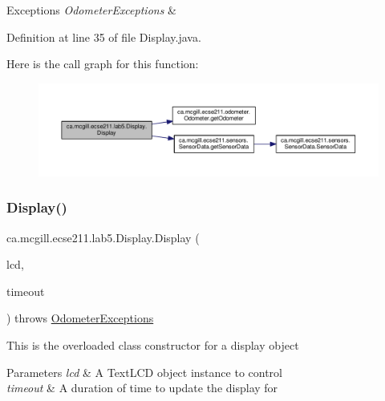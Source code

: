 \begin{DoxyExceptions}{Exceptions}
{\em Odometer\+Exceptions} & \\
\hline
\end{DoxyExceptions}


Definition at line 35 of file Display.\+java.

Here is the call graph for this function\+:\nopagebreak
\begin{figure}[H]
\begin{center}
\leavevmode
\includegraphics[width=350pt]{classca_1_1mcgill_1_1ecse211_1_1lab5_1_1_display_aeb15906f02c60c1ca449d4c37922739b_cgraph}
\end{center}
\end{figure}
\mbox{\label{classca_1_1mcgill_1_1ecse211_1_1lab5_1_1_display_abb1c01962b84cfad6ff897ce490b365a}} 
\subsubsection{\texorpdfstring{Display()}{Display()}\hspace{0.1cm}{\footnotesize\ttfamily [2/2]}}
{\footnotesize\ttfamily ca.\+mcgill.\+ecse211.\+lab5.\+Display.\+Display (\begin{DoxyParamCaption}\item[{Text\+L\+CD}]{lcd,  }\item[{long}]{timeout }\end{DoxyParamCaption}) throws \hyperlink{classca_1_1mcgill_1_1ecse211_1_1odometer_1_1_odometer_exceptions}{Odometer\+Exceptions}}

This is the overloaded class constructor for a display object


\begin{DoxyParams}{Parameters}
{\em lcd} & A Text\+L\+CD object instance to control \\
\hline
{\em timeout} & A duration of time to update the display for \\
\hline
\end{DoxyParams}

